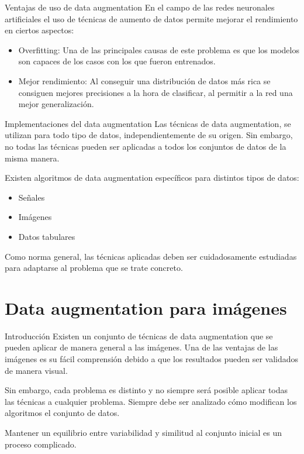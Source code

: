 \begin{frame}{Ventajas de uso de data augmentation}
En el campo de las \alert{redes neuronales artificiales} el uso de técnicas de aumento de datos permite \alert{mejorar el rendimiento} en ciertos aspectos:
\begin{itemize}
    \item \alert{Overfitting}: Una de las principales causas de este problema es que los modelos son capaces de  los casos con los que fueron entrenados.
    \item \alert{Mejor rendimiento}: Al conseguir una distribución de datos más rica se consiguen mejores \alert{precisiones} a la hora de clasificar, al permitir a la red una mejor \alert{generalización}.
\end{itemize}
\end{frame}

\begin{frame}{Implementaciones del data augmentation}
Las técnicas de data augmentation, se utilizan para \alert{todo tipo de datos}, independientemente de su origen. Sin embargo, \alert{no todas las técnicas} pueden ser aplicadas a \alert{todos los conjuntos} de datos de la misma manera.

Existen algoritmos de \alert{data augmentation} específicos para distintos tipos de datos:
\begin{itemize}
    \item \alert{Señales}
    \item \alert{Imágenes}
    \item \alert{Datos tabulares}
\end{itemize}

Como norma general, las técnicas aplicadas deben ser cuidadosamente \alert{estudiadas} para adaptarse al \alert{problema} que se trate concreto.
\end{frame}

\section{Data augmentation para imágenes}

\begin{frame}{Introducción}
Existen un conjunto de técnicas de data augmentation que se pueden aplicar de manera general a las \alert{imágenes}. Una de las ventajas de las imágenes es su \alert{fácil comprensión} debido a que los resultados pueden ser \alert{validados de manera visual}.

Sin embargo, cada \alert{problema es distinto} y no siempre será posible aplicar todas las técnicas a cualquier problema. Siempre debe ser analizado \alert{cómo modifican} los algoritmos el conjunto de datos.

Mantener un equilibrio entre \alert{variabilidad} y \alert{similitud} al conjunto inicial es un proceso complicado.
\end{frame}

